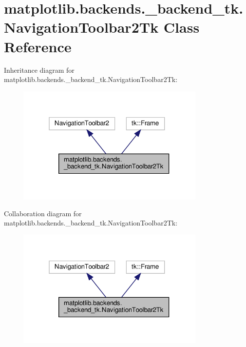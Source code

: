 \hypertarget{classmatplotlib_1_1backends_1_1__backend__tk_1_1NavigationToolbar2Tk}{}\section{matplotlib.\+backends.\+\_\+backend\+\_\+tk.\+Navigation\+Toolbar2\+Tk Class Reference}
\label{classmatplotlib_1_1backends_1_1__backend__tk_1_1NavigationToolbar2Tk}


Inheritance diagram for matplotlib.\+backends.\+\_\+backend\+\_\+tk.\+Navigation\+Toolbar2\+Tk\+:
\nopagebreak
\begin{figure}[H]
\begin{center}
\leavevmode
\includegraphics[width=265pt]{classmatplotlib_1_1backends_1_1__backend__tk_1_1NavigationToolbar2Tk__inherit__graph}
\end{center}
\end{figure}


Collaboration diagram for matplotlib.\+backends.\+\_\+backend\+\_\+tk.\+Navigation\+Toolbar2\+Tk\+:
\nopagebreak
\begin{figure}[H]
\begin{center}
\leavevmode
\includegraphics[width=265pt]{classmatplotlib_1_1backends_1_1__backend__tk_1_1NavigationToolbar2Tk__coll__graph}
\end{center}
\end{figure}
